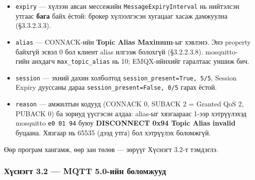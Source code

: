 \begin{itemize}
\tightlist
\item
  \texttt{expiry} --- хүлээн авсан мессежийн \texttt{MessageExpiryInterval} нь нийтэлсэн утгаас \textbf{бага} байх ёстой: брокер хүлээлгэсэн хугацааг хасаж дамжуулна (§3.3.2.3.3).
\item
  \texttt{alias} --- CONNACK-ийн \textbf{Topic Alias Maximum}-ыг хэвлэнэ. Энэ property байхгүй эсвэл 0 бол клиент alias илгээж болохгүй (§3.2.2.3.8). mosquitto-гийн анхдагч \texttt{max\_\allowbreak{}topic\_\allowbreak{}alias} нь 10; EMQX-ийнхийг гаралтаас уншиж бич.
\item
  \texttt{session} --- эхний дахин холболтод \texttt{session\_\allowbreak{}present=\allowbreak{}True,\ 5/\allowbreak{}5}, Session Expiry дууссаны дараа \texttt{session\_\allowbreak{}present=\allowbreak{}False,\ 0/\allowbreak{}5} гарах ёстой.
\item
  \texttt{reason} --- амжилтын кодууд (CONNACK 0, SUBACK 2 = Granted QoS 2, PUBACK 0) ба зориуд үүсгэсэн алдаа: alias-ыг хязгаараас 1-ээр хэтрүүлэхэд mosquitto \texttt{e0\ 01\ 94} буюу \textbf{DISCONNECT 0x94 Topic Alias invalid} буцаана. Хязгаар нь 65535 (дээд утга) бол хэтрүүлэх боломжгүй.
\end{itemize}

Өөр програм хангамж, өөр зан төлөв --- зөрүүг Хүснэгт 3.2-т тэмдэглэ.

\hypertarget{ux445ux4afux441ux43dux44dux433ux442-3.2-mqtt-5.0-ux438ux439ux43d-ux431ux43eux43bux43eux43cux436ux443ux443ux434}{%
\subsubsection{Хүснэгт 3.2 --- MQTT 5.0-ийн боломжууд}\label{ux445ux4afux441ux43dux44dux433ux442-3.2-mqtt-5.0-ux438ux439ux43d-ux431ux43eux43bux43eux43cux436ux443ux443ux434}}

